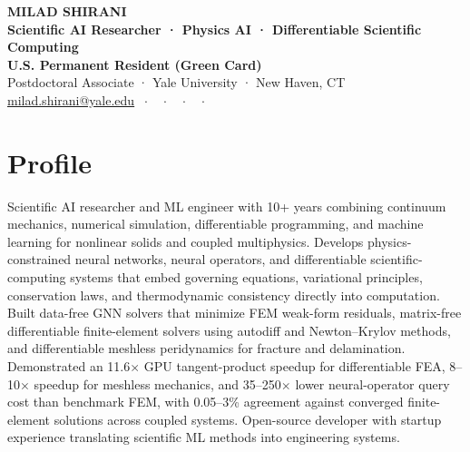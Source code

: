 \documentclass[10pt, letterpaper]{article}
\begin{document}

\begin{center}

  {\fontsize{24}{28}\selectfont
  \bfseries\color{navyblue}
  MILAD SHIRANI}
  \\[3pt]

  {\color{darkgray}
  \large
  \textbf{Scientific AI Researcher · Physics AI · Differentiable Scientific Computing}}
  \\[4pt]

  {\color{midgray}
  \textbf{U.S. Permanent Resident (Green Card)}}
  \\[2pt]

  {\color{midgray}
  Postdoctoral Associate · Yale University · New Haven, CT}
  \\[3pt]

  {\color{midgray}
    \href{mailto:milad.shirani@yale.edu}{milad.shirani@yale.edu}
    $\;\cdot\;$
    \href{https://scholar.google.com/citations?hl=en&user=pgoR_BkAAAAJ&view_op=list_works&sortby=pubdate}
    {\faGraduationCap}
    $\;\cdot\;$
    \href{https://linkedin.com/in/miladshirani}{\faLinkedin}
    $\;\cdot\;$
    \href{https://github.com/miladshirani}{\faGithub}
    $\;\cdot\;$
    \href{https://miladshirani.github.io}{\faGlobe}
  }

\end{center}

\vspace{1pt}



\section{Profile}

Scientific AI researcher and ML engineer with 10+ years combining continuum
mechanics, numerical simulation, differentiable programming, and machine learning
for nonlinear solids and coupled multiphysics. Develops physics-constrained neural
networks, neural operators, and differentiable scientific-computing systems that
embed governing equations, variational principles, conservation laws, and
thermodynamic consistency directly into computation. Built data-free GNN solvers
that minimize FEM weak-form residuals, matrix-free differentiable finite-element
solvers using autodiff and Newton--Krylov methods, and differentiable meshless
peridynamics for fracture and delamination. Demonstrated an 11.6$\times$ GPU
tangent-product speedup for differentiable FEA, 8--10$\times$ speedup for meshless mechanics,
and 35--250$\times$ lower neural-operator query cost than benchmark FEM, with
0.05--3\% agreement against converged finite-element solutions across coupled
systems. Open-source developer with startup experience translating scientific ML
methods into engineering systems.
\end{document}

